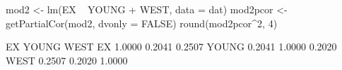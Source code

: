 \begin{Schunk}
\begin{Sinput}
 mod2 <- lm(EX ~ YOUNG + WEST, data = dat)
 mod2pcor <- getPartialCor(mod2, dvonly = FALSE)
 round(mod2pcor^2, 4)
\end{Sinput}
\begin{Soutput}
          EX  YOUNG   WEST
EX    1.0000 0.2041 0.2507
YOUNG 0.2041 1.0000 0.2020
WEST  0.2507 0.2020 1.0000
\end{Soutput}
\end{Schunk}
